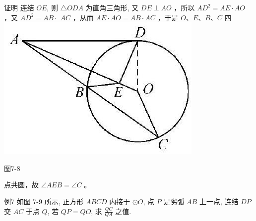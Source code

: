\documentclass[10pt]{article}
\begin{document}
证明 连结 $O E$, 则 $\triangle O D A$ 为直角三角形, 又 $D E \perp A O$ ，所以 $A D^{2}=A E \cdot A O$ ，又 $A D^{2}=A B \cdot$ $A C$ ，从而 $A E \cdot A O=A B \cdot A C$ ，于是 $O 、 E 、 B 、 C$ 四\\
\includegraphics[max width=\textwidth, center]{2024_10_30_66b8e5e701da2093c133g-054(1)}

图7-8

点共圆，故 $\angle A E B=\angle C$ 。

例7 如图 7-9 所示, 正方形 $A B C D$ 内接于 $\odot O$, 点 $P$ 是劣弧 $A B$ 上一点, 连结 $D P$ 交 $A C$ 于点 $Q$, 若 $Q P=Q O$, 求 $\frac{Q C}{Q A}$ 之值.
\end{document}
